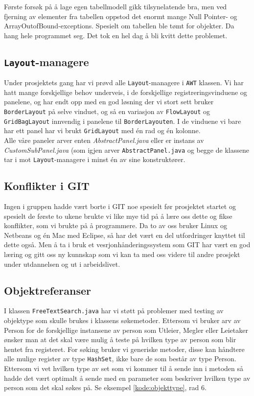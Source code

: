 Første forsøk på å lage egen tabellmodell gikk tilsynelatende bra, men ved fjerning av elementer fra tabellen oppstod det enormt mange Null Pointer- og ArrayOutofBound-exceptions. Spesielt om tabellen ble tømt for objekter. Da hang hele programmet seg. Det tok en hel dag å bli kvitt dette problemet. 
\subsection{\texttt{Layout}-managere}
Under prosjektets gang har vi prøvd alle \texttt{Layout}-managere i \texttt{AWT} klassen.
Vi har hatt mange forskjellige behov underveis, i de forskjellige registreringsvinduene og panelene, og har endt opp med en god løsning der vi stort sett bruker \texttt{BorderLayout} på selve vinduet, og så en variasjon av \texttt{FlowLayout} og \texttt{GridBagLayout} innvendig i panelene til \texttt{BorderLayouten}.
I de vinduene vi bare har ett panel har vi brukt \texttt{GridLayout} med én rad og én kolonne. \\
Alle våre paneler arver enten \emph{AbstractPanel.java} eller er instans av \emph{CustomSubPanel.java} (som igjen arver \texttt{AbstractPanel.java} og begge de klassene tar i mot \texttt{Layout}-managere i minst én av sine konstruktører.

\subsection{Konflikter i GIT}
Ingen i gruppen hadde vært borte i GIT noe spesielt før prosjektet startet og spesielt de første to ukene brukte vi like mye tid på å lære oss dette og fikse konflikter, som vi brukte på å programmere. Da to av oss bruker Linux og Netbeans og én Mac med Eclipse, så har det vært en del utfordringer knyttet til dette også. Men å ta i bruk et vesrjonhånderingssystem som GIT har vært en god læring og gitt oss ny kunnskap som vi kan ta med oss videre til andre prosjekt under utdannelsen og ut i arbeidslivet.


\subsection{Objektreferanser}
I klassen \texttt{FreeTextSearch.java} har vi støtt på problemer med testing av objektype som skulle brukes i klassens søkemetoder. Ettersom vi bruker arv av Person for de forskjellige instansene av person som Utleier, Megler eller Leietaker ønsker man at det skal være mulig å teste på hvilken type av person som blir hentet fra registeret. 
For søking bruker vi generiske metoder, disse kan håndtere alle mulige register av type \texttt{HashSet}, ikke bare de som består av type Person. 
Ettersom vi vet hvilken type av set som vi kommer til å sende inn i metoden så hadde det vært optimalt å sende med en parameter som beskriver hvilken type av person som det skal søkes på. Se eksempel \ref{kode:objekttype}, rad 6. 

